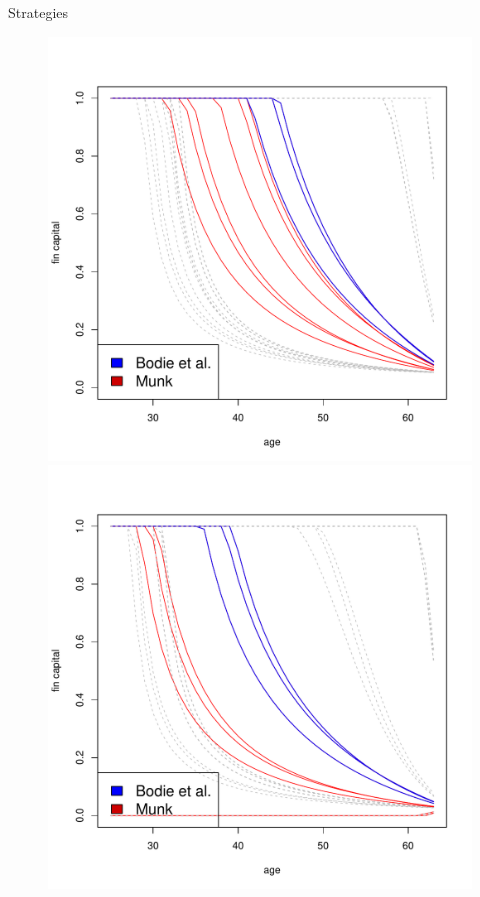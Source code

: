 \documentclass{beamer}
\begin{document}
\begin{frame}[allowframebreaks]{Strategies}
\begin{itemize}
\begin{figure}
		\includegraphics[scale=0.25]{figs/individuals5.pdf}
		\includegraphics[scale=0.25]{figs/individuals10.pdf}
\end{figure}


\end{itemize}
\end{frame}
\end{document}
